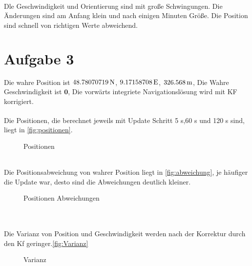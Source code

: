 \begin{figure}[htpb]\centering
\end{figure}\\
Dle Geschwindigkeit und Orientierung sind mit große Schwingungen. Die Änderungen sind am Anfang klein und nach einigen Minuten Größe. Die Position sind schnell von richtigen Werte abweichend.
\clearpage
\section{Aufgabe 3}
Die wahre Position ist $48.78070719 \,\mathrm{N}$, $9.17158708 \,\mathrm{E}$, $326.568 \,\mathrm{m}$, Die Wahre Geschwindigkeit ist $\bm{0}$, Die vorwärts integriete Navigationslösung wird mit KF korrigiert. \\\\
Die Positionen, die berechnet jeweils mit Update Schritt 5 s,60 s und 120 s sind, liegt in \autoref{fig:positionen}.
\begin{figure}[htpb]\centering
	\caption{Positionen}
	\label{fig:positionen}
\end{figure}\\
Die Positionsabweichung von wahrer Position liegt in \autoref{fig:abweichung}, je häufiger die Update war, desto sind die Abweichungen deutlich kleiner. 
\begin{figure}[htpb]\centering
	\caption{Positionen Abweichungen}
	\label{fig:abweichung}
\end{figure}\\\\
Die Varianz von Position und Geschwindigkeit werden nach der Korrektur durch den Kf geringer.\autoref{fig:Varianz}
\begin{figure}[htpb]\centering
	\caption{Varianz}
	\label{fig:Varianz}
\end{figure}